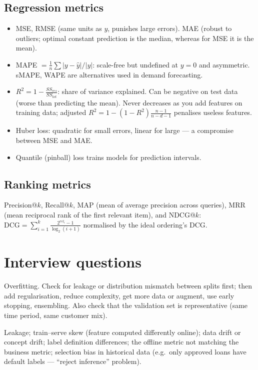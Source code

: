 \subsection{Regression metrics}
\begin{itemize}
  \item MSE, RMSE (same units as $y$, punishes large errors). MAE (robust to outliers; optimal constant prediction is the median, whereas for MSE it is the mean).
  \item MAPE $=\frac1n\sum|y-\hat y|/|y|$: scale-free but undefined at $y=0$ and asymmetric. sMAPE, WAPE are alternatives used in demand forecasting.
  \item $R^2=1-\frac{SS_{res}}{SS_{tot}}$: share of variance explained. Can be negative on test data (worse than predicting the mean). Never decreases as you add features on training data; adjusted $R^2=1-(1-R^2)\frac{n-1}{n-d-1}$ penalises useless features.
  \item Huber loss: quadratic for small errors, linear for large --- a compromise between MSE and MAE.
  \item Quantile (pinball) loss trains models for prediction intervals.
\end{itemize}

\subsection{Ranking metrics}
Precision@$k$, Recall@$k$, MAP (mean of average precision across queries), MRR (mean reciprocal rank of the first relevant item), and NDCG@$k$: $\text{DCG}=\sum_{i=1}^k\frac{2^{rel_i}-1}{\log_2(i+1)}$ normalised by the ideal ordering's DCG.

\section{Interview questions}
\A Overfitting. Check for leakage or distribution mismatch between splits first; then add regularisation, reduce complexity, get more data or augment, use early stopping, ensembling. Also check that the validation set is representative (same time period, same customer mix).

\A Leakage; train--serve skew (feature computed differently online); data drift or concept drift; label definition differences; the offline metric not matching the business metric; selection bias in historical data (e.g.\ only approved loans have default labels --- ``reject inference'' problem).

